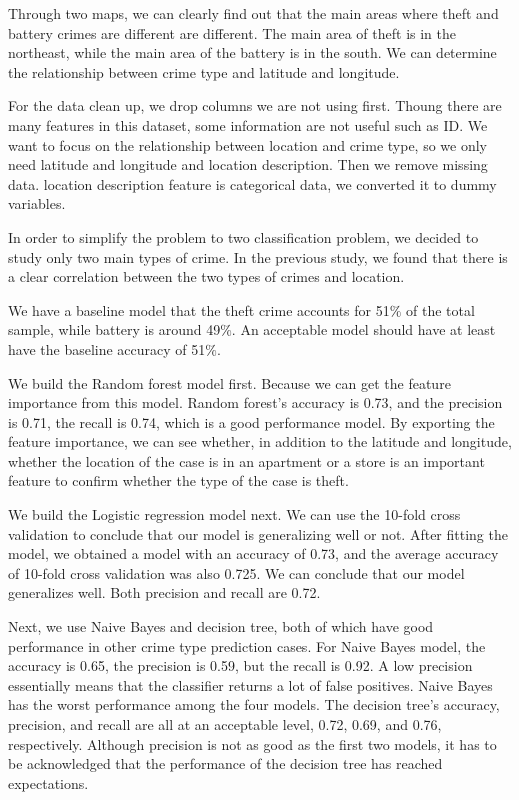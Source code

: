 \documentclass{article}
\begin{document}
Through two maps, we can clearly find out that the main areas where theft and battery crimes are different are different. The main area of theft is in the northeast, while the main area of the battery is in the south. We can determine the relationship between crime type and latitude and longitude.

For the data clean up, we drop columns we are not using first. Thoung there are many features in this dataset, some information are not useful such as ID. We want to focus on the relationship between location and crime type, so we only need latitude and longitude and location description. Then we remove missing data. location description feature is categorical data, we converted it to dummy variables. 

In order to simplify the problem to two classification problem, we decided to study only two main types of crime. In the previous study, we found that there is a clear correlation between the two types of crimes and location.

We have a baseline model that the theft crime accounts for 51$\%$ of the total sample, while battery is around 49$\%$. An acceptable model should have at least have the baseline accuracy of 51$\%$.

We build the Random forest model first. Because we can get the feature importance from this model. Random forest's accuracy is 0.73, and the precision is 0.71, the recall is 0.74, which is a good performance model. By exporting the feature importance, we can see whether, in addition to the latitude and longitude, whether the location of the case is in an apartment or a store is an important feature to confirm whether the type of the case is theft.

We build the Logistic regression model next. We can use the 10-fold cross validation to conclude that our model is generalizing well or not. After fitting the model, we obtained a model with an accuracy of 0.73, and the average accuracy of 10-fold cross validation was also 0.725. We can conclude that our model generalizes well. Both precision and recall are 0.72.

Next, we use Naive Bayes and decision tree, both of which have good performance in other crime type prediction cases. For Naive Bayes model, the accuracy is 0.65, the precision is 0.59, but the recall is 0.92. A low precision essentially means that the classifier returns a lot of false positives. Naive Bayes has the worst performance among the four models. The decision tree's accuracy, precision, and recall are all at an acceptable level, 0.72, 0.69, and 0.76, respectively. Although precision is not as good as the first two models, it has to be acknowledged that the performance of the decision tree has reached expectations. 
\end{document}
